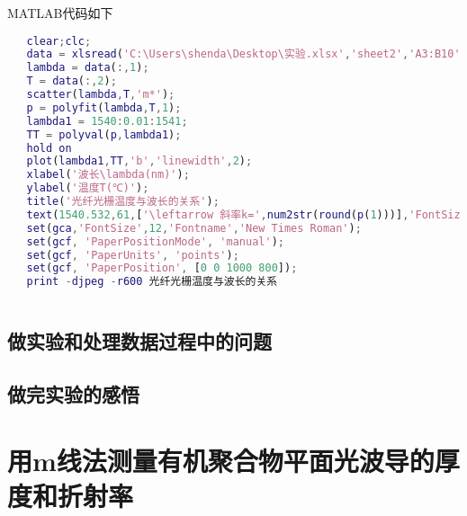 \documentclass{zjureport}
\begin{document}
\begin{clause}
   	\item MATLAB代码如下
   	\begin{lstlisting}[language=MATLAB]
   %光纤光栅温度与波长的关系
   clear;clc;
   data = xlsread('C:\Users\shenda\Desktop\实验.xlsx','sheet2','A3:B10');
   lambda = data(:,1);
   T = data(:,2);
   scatter(lambda,T,'m*');
   p = polyfit(lambda,T,1);
   lambda1 = 1540:0.01:1541;
   TT = polyval(p,lambda1);
   hold on
   plot(lambda1,TT,'b','linewidth',2);
   xlabel('波长\lambda(nm)');
   ylabel('温度T(℃)');
   title('光纤光栅温度与波长的关系');
   text(1540.532,61,['\leftarrow 斜率k=',num2str(round(p(1)))],'FontSize',12);
   set(gca,'FontSize',12,'Fontname','New Times Roman');
   set(gcf, 'PaperPositionMode', 'manual');
   set(gcf, 'PaperUnits', 'points');
   set(gcf, 'PaperPosition', [0 0 1000 800]);
   print -djpeg -r600 光纤光栅温度与波长的关系
   	
   	\end{lstlisting}
   \end{clause}

 
 \subsection{做实验和处理数据过程中的问题}
 \subsection{做完实验的感悟}

\section{用m线法测量有机聚合物平面光波导的厚度和折射率}
\end{document}
